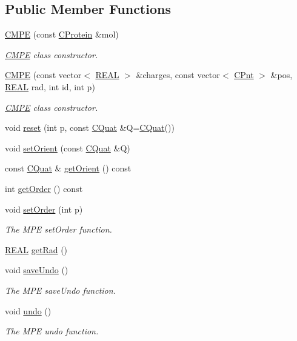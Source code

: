 \subsection*{Public Member Functions}
\begin{DoxyCompactItemize}
\item 
\hyperlink{classCMPE_aee8dd608bd75c7d0415da2746f54acee}{C\-M\-P\-E} (const \hyperlink{classCProtein}{C\-Protein} \&mol)
\begin{DoxyCompactList}\small\item\em \hyperlink{classCMPE}{C\-M\-P\-E} class constructor. \end{DoxyCompactList}\item 
\hyperlink{classCMPE_adbfa1276efd0ce18d73b6943542d6147}{C\-M\-P\-E} (const vector$<$ \hyperlink{util_8h_a5821460e95a0800cf9f24c38915cbbde}{R\-E\-A\-L} $>$ \&charges, const vector$<$ \hyperlink{classCPnt}{C\-Pnt} $>$ \&pos, \hyperlink{util_8h_a5821460e95a0800cf9f24c38915cbbde}{R\-E\-A\-L} rad, int id, int p)
\begin{DoxyCompactList}\small\item\em \hyperlink{classCMPE}{C\-M\-P\-E} class constructor. \end{DoxyCompactList}\item 
void \hyperlink{classCMPE_ae44b4e76215412230e279f34bd5b9fab}{reset} (int p, const \hyperlink{classCQuat}{C\-Quat} \&Q=\hyperlink{classCQuat}{C\-Quat}())
\item 
void \hyperlink{classCMPE_a688ea48a4a13e704fc97e27c0f6dc78a}{set\-Orient} (const \hyperlink{classCQuat}{C\-Quat} \&Q)
\item 
const \hyperlink{classCQuat}{C\-Quat} \& \hyperlink{classCMPE_a30f8be93a38d1e9ead77be6bbdc8488f}{get\-Orient} () const 
\item 
int \hyperlink{classCMPE_a047394488b2ce41894b336b6a1d8e30a}{get\-Order} () const 
\item 
void \hyperlink{classCMPE_a403e7cea8cfca8cb9e76dff5dc396c10}{set\-Order} (int p)
\begin{DoxyCompactList}\small\item\em The M\-P\-E set\-Order function. \end{DoxyCompactList}\item 
\hyperlink{util_8h_a5821460e95a0800cf9f24c38915cbbde}{R\-E\-A\-L} \hyperlink{classCMPE_aa34361e7b83d5e63f866773e9c745588}{get\-Rad} ()
\item 
void \hyperlink{classCMPE_ad67fb6e520dbc05e63152b18a6363014}{save\-Undo} ()
\begin{DoxyCompactList}\small\item\em The M\-P\-E save\-Undo function. \end{DoxyCompactList}\item 
void \hyperlink{classCMPE_a7033cf96c5b5f6301c6021c97a3f6d36}{undo} ()
\begin{DoxyCompactList}\small\item\em The M\-P\-E undo function. \end{DoxyCompactList}\end{DoxyCompactItemize}
